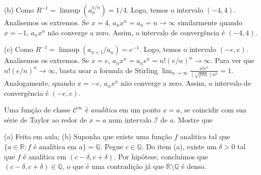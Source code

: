 \documentclass[11pt]{exam}
\begin{document}
\begin{questions}
\begin{solution}
   
   (b) Como $R^{-1}=\limsup (a_{n}^{1/n})=1/4$. Logo, temos o intervalo
   $(-4,4)$. Analisemos os extremos. Se $x=4$, $a_{n}x^{n}=a_{n}=n \rightarrow \infty$ similarmente quando $x=-1$, $a_{n}x^{n}$ não converge a zero. Assim, o intervalo de convergência é $(-4,4)$.
   
   (c) Como $R^{-1}=\limsup (a_{n+1}/a_n)=e^{-1}$. Logo, temos o intervalo
   $(-e,e)$. Analisemos os extremos. Se $x=e$, 
   $a_{n}x^{n}=a_{n}e^{n}=n!(e/n)^{n} \rightarrow \infty$. 
   Para ver que $n!(e/n)^{n} \rightarrow \infty$, basta usar a
   formula de Stirling 
   $\lim_{n \rightarrow \infty } \frac{n! e^{n}}{(\sqrt{2\pi n})n^{n}}=1$.    Analogamente, quando $x=-e$, $a_{n}x^{n}$ não converge a zero. Assim, o intervalo de convergência é $(-e,e)$.
  \end{solution}    
 \question Uma função de classe $\mathcal{C}^{\infty}$ é {\it analítica} em um ponto $x=a$, se coincidir com sua série de Taylor ao redor de
 $x=a$ num intervalo $\mathcal{I}$ de $a$. Mostre que 
   \begin{solution}
   (a) Feito em aula; (b) Suponha que existe uma função 
    $f$ analitica tal que 
    $\{a \in \mathbb{R}: f \text{ é analítica em } a\}=\mathbb{Q}$. 
    Pegue $c \in \mathbb{Q}$. Do item (a), existe um $\delta>0$
    tal que $f$ é analítica em $(c-\delta, c+\delta)$. Por hipótese, 
    concluímos que $(c-\delta, c+\delta) \in \mathbb{Q}$, o que é uma contradição já que $\mathbb{R}\setminus \mathbb{Q}$ é denso.
   \end{solution}
 \end{questions}
\end{document}
